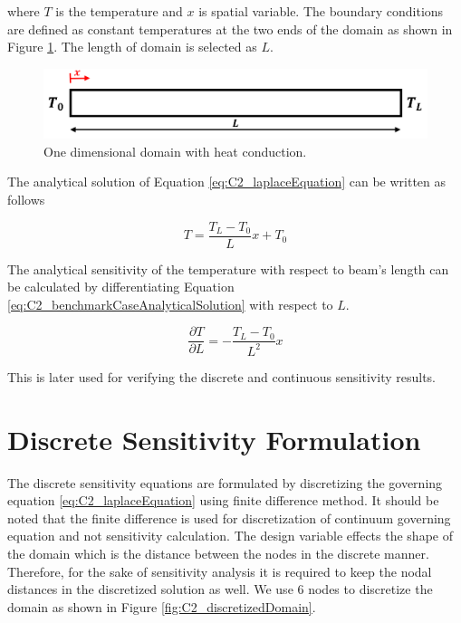 where $T$ is the temperature and $x$ is spatial variable. The boundary conditions are defined as constant temperatures at the two ends of the domain as shown in Figure \ref{fig:C2_benchmarkCase}. The length of domain is selected as $L$.

\begin{figure}[h]
	\centering
	\includegraphics[width=14.00cm]{Chapter_2/figure/benchmark_case.png}
	\caption{One dimensional domain with heat conduction.}
	\label{fig:C2_benchmarkCase}
\end{figure}

The analytical solution of Equation \eqref{eq:C2_laplaceEquation} can be written as follows

\begin{equation}\label{eq:C2_benchmarkCaseAnalyticalSolution}
	T = \frac{T_L - T_0}{L} x + T_0
\end{equation}

The analytical sensitivity of the temperature with respect to beam's length can be calculated by differentiating Equation \eqref{eq:C2_benchmarkCaseAnalyticalSolution} with respect to $L$.

\begin{equation}
	\frac{\partial T}{\partial L} = -\frac{T_L - T_0}{L^2} x
\end{equation}

This is later used for verifying the discrete and continuous sensitivity results.

\section{Discrete Sensitivity Formulation}
The discrete sensitivity equations are formulated by discretizing the governing equation \eqref{eq:C2_laplaceEquation} using finite difference method. It should be noted that the finite difference is used for discretization of continuum governing equation and not sensitivity calculation. The design variable effects the shape of the domain which is the distance between the nodes in the discrete manner. Therefore, for the sake of sensitivity analysis it is required to keep the nodal distances in the discretized solution as well. We use 6 nodes to discretize the domain as shown in Figure \ref{fig:C2_discretizedDomain}.

